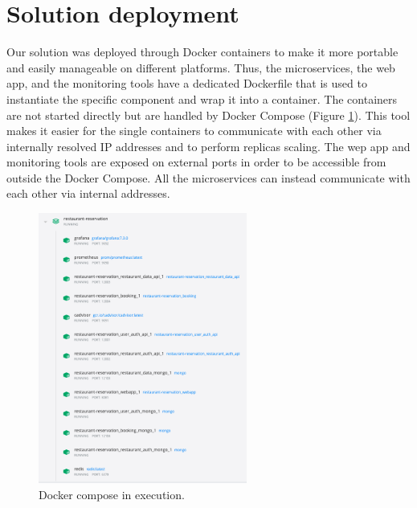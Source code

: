 \section{Solution deployment}
Our solution was deployed through Docker containers to make it more portable
and easily manageable on different platforms. Thus, the microservices, the
web app, and the monitoring tools have a dedicated Dockerfile that is
used to instantiate the specific component and wrap it into a container.
The containers are not started directly but are handled by Docker Compose
(Figure \ref{fig:docker_compose}).
This tool makes it easier for the single containers to communicate with each
other via internally resolved IP addresses and to perform replicas scaling.
The wep app and monitoring tools are exposed on external ports in order
to be accessible from outside the Docker Compose. All the microservices can
instead communicate with each other via internal addresses.


\begin{figure}
    \begin{center}
        \includegraphics[height=3.5in]{./images/docker_compose.png}
    \end{center}
    \caption{Docker compose in execution.}
    \label{fig:docker_compose}
\end{figure}
